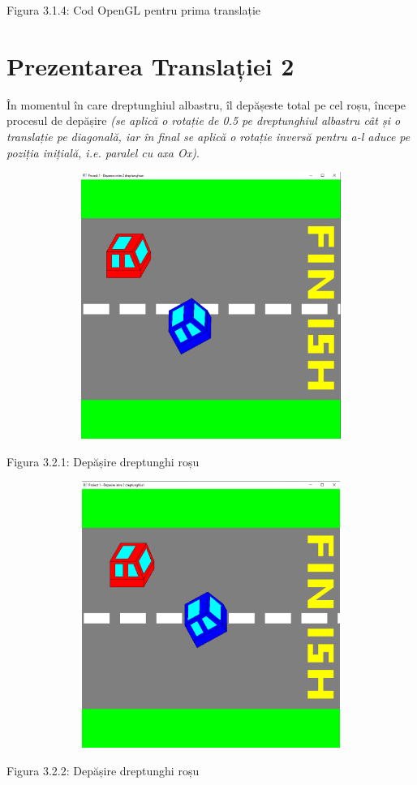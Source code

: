 \documentclass[12pt]{report}
\begin{document}
    
    \begin{center}
        Figura 3.1.4: Cod OpenGL pentru prima translație
    \end{center}

    \section{Prezentarea Translației 2}
    În momentul în care dreptunghiul albastru, îl depășeste total pe cel roșu, începe procesul de depășire \emph{(se aplică
    o rotație de 0.5 pe dreptunghiul albastru cât și o translație pe diagonală, iar în final se aplică o rotație
    inversă pentru a-l aduce pe poziția inițială, i.e. paralel cu axa Ox)}.
    \begin{center}
        \includegraphics[width=15cm, height=8.7cm]{Poza8.png}
    \end{center}
    \begin{center}
        Figura 3.2.1: Depășire dreptunghi roșu
    \end{center}

    \begin{center}
        \includegraphics[width=15cm, height=8.7cm]{Poza9.png}
    \end{center}
    \begin{center}
        Figura 3.2.2: Depășire dreptunghi roșu
    \end{center}
\end{document}
